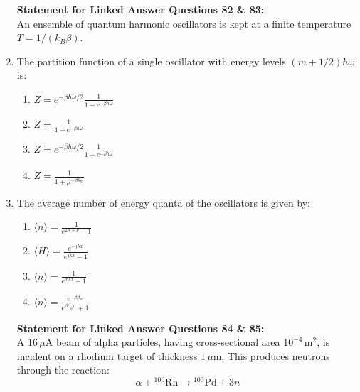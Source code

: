 \documentclass[journal,13pt,onecolumn]{IEEEtran}
\begin{document}
\begin{enumerate}[itemsep = 1em]
\newpage

\textbf{Statement for Linked Answer Questions 82 \& 83:} \\
An ensemble of quantum harmonic oscillators is kept at a finite temperature $T = 1/(k_B \beta)$.

\item The partition function of a single oscillator with energy levels $(m + 1/2)\hbar \omega$ is:

\hfill{}

\begin{multicols}{2}
\begin{enumerate}
    \item $Z = e^{-\beta \hbar \omega /2} \frac{1}{1 - e^{-\beta \hbar \omega}}$
    \item $Z = \frac{1}{1 - e^{-\beta \hbar \omega}}$
    \item $Z = e^{-\beta \hbar \omega /2} \frac{1}{1 + e^{-\beta \hbar \omega}}$
    \item $Z = \frac{1}{1 + \mu^{-\beta k_m}}$
\end{enumerate}
\end{multicols}

\item The average number of energy quanta of the oscillators is given by:

\hfill{}

\begin{multicols}{2}
\begin{enumerate}
    \item $\langle n \rangle = \frac{1}{e^{2\lambda + \nu} - 1}$
    \item $\langle H \rangle = \frac{e^{-j \lambda x}}{e^{j \lambda x} - 1}$
    \item $\langle n \rangle = \frac{1}{e^{x \lambda x} + 1}$
    \item $\langle n \rangle = \frac{e^{-\beta \beta_w}}{e^{\beta \beta_w \sigma} + 1}$
\end{enumerate}
\end{multicols}


\textbf{Statement for Linked Answer Questions 84 \& 85:} \\
A $16\,\mu\mathrm{A}$ beam of alpha particles, having cross-sectional area $10^{-4}\,\mathrm{m^2}$, is incident on a rhodium target of thickness $1\,\mu\mathrm{m}$. This produces neutrons through the reaction:  
\[
\alpha + {}^{100}\mathrm{Rh} \rightarrow {}^{100}\mathrm{Pd} + 3n
\]


\end{enumerate}
\end{document}
